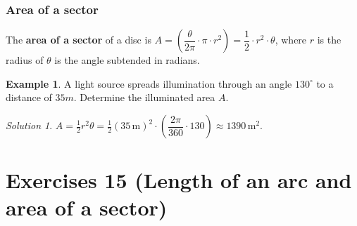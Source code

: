 \documentclass[
  12pt,
  oneside]{book}
\theoremstyle{definition}
\theoremstyle{definition}
\newtheorem{example}{Example}[chapter]
\theoremstyle{definition}
\theoremstyle{definition}
\theoremstyle{remark}
\newtheorem*{solution}{Solution}
\begin{document}
\hypertarget{area-of-a-sector}{%
\subsection{Area of a sector}\label{area-of-a-sector}}

The \textbf{area of a sector} of a disc is \(A=\left(\dfrac{\theta}{2\pi}\cdot\pi\cdot r^2\right) = \dfrac{1}{2}\cdot r^2\cdot \theta\), where \(r\) is the radius of \(\theta\) is the angle subtended in radians.

\begin{example}
A light source spreads illumination through an angle \(130^\circ\) to a distance of \(35m\). Determine the illuminated area \(A\).
\end{example}

\begin{solution}
\(A=\frac12 r^2\theta = \frac12\left(35\,\mathrm{m}\right)^2\cdot\left(\dfrac{2\pi}{360}\cdot 130\right) \approx 1390\,\mathrm{m}^2\).
\end{solution}

\hypertarget{exercises-15-length-of-an-arc-and-area-of-a-sector}{%
\chapter*{Exercises 15 (Length of an arc and area of a sector)}\label{exercises-15-length-of-an-arc-and-area-of-a-sector}}
\end{document}
